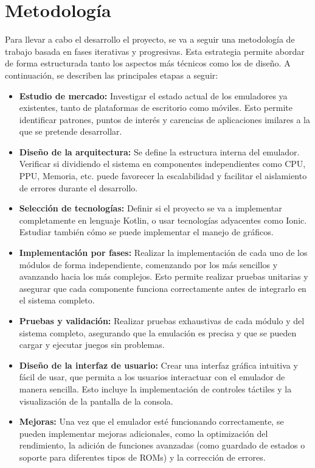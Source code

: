 \section{Metodología}

Para llevar a cabo el desarrollo el proyecto, se va a seguir una metodología de trabajo basada en fases iterativas y progresivas. Esta estrategia permite abordar de forma estructurada tanto los aspectos más técnicos como los de diseño. A continuación, se describen las principales etapas a seguir:

\begin{itemize}
    \item \textbf{Estudio de mercado:} Investigar el estado actual de los emuladores ya existentes, tanto de plataformas de escritorio como móviles. Esto permite identificar patrones, puntos de interés y carencias de aplicaciones imilares a la que se pretende desarrollar.
    \item \textbf{Diseño de la arquitectura:} Se define la estructura interna del emulador. Verificar si dividiendo el sistema en componentes independientes como CPU, PPU, Memoria, etc. puede favorecer la escalabilidad y facilitar el aislamiento de errores durante el desarrollo.
    \item \textbf{Selección de tecnologías:} Definir si el proyecto se va a implementar completamente en lenguaje Kotlin, o usar tecnologías adyacentes como Ionic. Estudiar también cómo se puede implementar el manejo de gráficos.
    \item \textbf{Implementación por fases:} Realizar la implementación de cada uno de los módulos de forma independiente, comenzando por los más sencillos y avanzando hacia los más complejos. Esto permite realizar pruebas unitarias y asegurar que cada componente funciona correctamente antes de integrarlo en el sistema completo.
    \item \textbf{Pruebas y validación:} Realizar pruebas exhaustivas de cada módulo y del sistema completo, asegurando que la emulación es precisa y que se pueden cargar y ejecutar juegos sin problemas.
    \item \textbf{Diseño de la interfaz de usuario:} Crear una interfaz gráfica intuitiva y fácil de usar, que permita a los usuarios interactuar con el emulador de manera sencilla. Esto incluye la implementación de controles táctiles y la visualización de la pantalla de la consola.
    \item \textbf{Mejoras:} Una vez que el emulador esté funcionando correctamente, se pueden implementar mejoras adicionales, como la optimización del rendimiento, la adición de funciones avanzadas (como guardado de estados o soporte para diferentes tipos de ROMs) y la corrección de errores.
\end{itemize}


